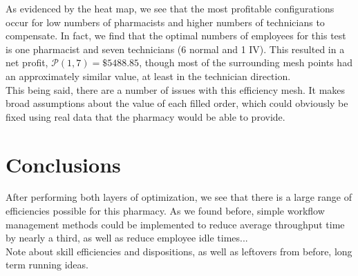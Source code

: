 \documentclass[10pt]{report}            %
\begin{document}
As evidenced by the heat map, we see that the most profitable configurations occur for low numbers of pharmacists and higher numbers of technicians to compensate.  In fact, we find that the optimal numbers of employees for this test is one pharmacist and seven technicians (6 normal and 1 IV). This resulted in a net profit, $\mathcal{P}(1,7)=\$5488.85$, though most of the surrounding mesh points had an approximately similar value, at least in the technician direction.\\
This being said, there are a number of issues with this efficiency mesh. It makes broad assumptions about the value of each filled order, which could obviously be fixed using real data that the pharmacy would be able to provide.
\section*{Conclusions}
After performing both layers of optimization, we see that there is a large range of efficiencies possible for this pharmacy. As we found before, simple workflow management methods could be implemented to reduce average throughput time by nearly a third, as well as reduce employee idle times...\\
Note about skill efficiencies and dispositions, as well as leftovers from before, long term running ideas.
%
%
\end{document}
